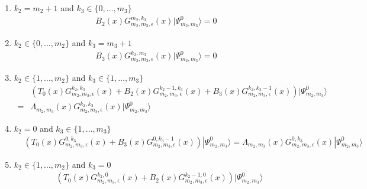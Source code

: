 \documentclass[11pt]{article}
\numberwithin{equation}{section}
\numberwithin{equation}{subsection}
\begin{document}
{\begin{enumerate}
\begin{equation}
T_{0}(x)G_{m_{2},m_{3},\epsilon}^{0,0}(x)|\Psi_{m_{1},m_{2}}^{0}\rangle=\Lambda_{m_{2},m_{3}}(x)G_{m_{2},m_{3},\epsilon}^{0,0}(x)|\Psi_{m_{1},m_{2}}^{0}\rangle
\end{equation}
\item $k_{2}=m_{2}+1$ and $k_{3}\in \{0,\ldots,m_{3}\}$
\begin{equation}\label{cond2}
\begin{split}
B_{2}(x)G_{m_{2},m_{3},\epsilon}^{m_{2},k_{3}}(x)|\Psi_{m_{2},m_{3}}^{0}\rangle=0
\end{split}
\end{equation}
\item $k_{2}\in\{0,\ldots,m_{2}\}$ and $k_{3}=m_{3}+1$
\begin{equation}\label{cond3}
\begin{split}
B_{3}(x)G_{m_{2},m_{3},\epsilon}^{k_{2},m_{3}}(x)|\Psi_{m_{2},m_{3}}^{0}\rangle=0
\end{split}
\end{equation}
\item $k_{2}\in \{1,\ldots,m_{2}\}$ and $k_{3}\in\{1,\ldots,m_{3}\}$
\begin{equation}\label{cond4}
\begin{split}
&\left(T_{0}(x)G_{m_{2},m_{3},\epsilon}^{k_{2},k_{3}}(x)+B_{2}(x)G_{m_{2},m_{3},\epsilon}^{k_{2}-1,k_{3}}(x)+B_{3}(x)G_{m_{2},m_{3},\epsilon}^{k_{2},k_{3}-1}(x)\right)|\Psi_{m_{2},m_{3}}^{0}\rangle
\\=&
\Lambda_{m_{2},m_{3}}(x)G_{m_{2},m_{3},\epsilon}^{k_{2},k_{3}}(x)|\Psi_{m_{2},m_{3}}^{0}\rangle
\end{split}
\end{equation} 
\item $k_{2}=0$ and $k_{3}\in\{1,\ldots,m_{3}\}$
\begin{equation}\label{cond5}
\begin{split}
&\left(T_{0}(x)G_{m_{2},m_{3},\epsilon}^{0,k_{3}}(x)+B_{3}(x)G_{m_{2},m_{3},\epsilon}^{0,k_{3}-1}(x)\right)|\Psi_{m_{2},m_{3}}^{0}\rangle
=
\Lambda_{m_{2},m_{3}}(x)G_{m_{2},m_{3},\epsilon}^{0,k_{3}}(x)|\Psi_{m_{2},m_{3}}^{0}\rangle
\end{split}
\end{equation}
\item $k_{2}\in\{1,\ldots,m_{2}\}$ and $k_{3}=0$
\begin{equation}\label{cond6}
\begin{split}
&\left(T_{0}(x)G_{m_{2},m_{3},\epsilon}^{k_{2},0}(x)+B_{2}(x)G_{m_{2},m_{3},\epsilon}^{k_{2}-1,0}(x)\right)|\Psi_{m_{2},m_{3}}^{0}\rangle

\end{split}
\end{equation}
\end{enumerate}}
\end{document}
